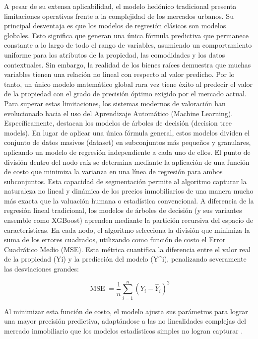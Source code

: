 A pesar de su extensa aplicabilidad, el modelo hedónico tradicional presenta limitaciones operativas frente a la complejidad de los mercados urbanos. Su principal desventaja es que los modelos de regresión clásicos son modelos globales. Esto significa que generan una única fórmula predictiva que permanece constante a lo largo de todo el rango de variables, asumiendo un comportamiento uniforme para los atributos de la propiedad, las comodidades y los datos contextuales. Sin embargo, la realidad de los bienes raíces demuestra que muchas variables tienen una relación no lineal con respecto al valor predicho. Por lo tanto, un único modelo matemático global rara vez tiene éxito al predecir el valor de la propiedad con el grado de precisión óptimo exigido por el mercado actual. Para superar estas limitaciones, los sistemas modernos de valoración han evolucionado hacia el uso del Aprendizaje Automático (Machine Learning). Específicamente, destacan los modelos de árboles de decisión (decision tree models). En lugar de aplicar una única fórmula general, estos modelos dividen el conjunto de datos masivos (dataset) en subconjuntos más pequeños y granulares, aplicando un modelo de regresión independiente a cada uno de ellos. El punto de división dentro del nodo raíz se determina mediante la aplicación de una función de costo que minimiza la varianza en una línea de regresión para ambos subconjuntos. Esta capacidad de segmentación permite al algoritmo capturar la naturaleza no lineal y dinámica de los precios inmobiliarios de una manera mucho más exacta que la valuación humana o estadística convencional. A diferencia de la regresión lineal tradicional, los modelos de árboles de decisión (y sus variantes ensemble como XGBoost) aprenden mediante la partición recursiva del espacio de características. En cada nodo, el algoritmo selecciona la división que minimiza la suma de los errores cuadrados, utilizando como función de costo el Error Cuadrático Medio (MSE). Esta métrica cuantifica la diferencia entre el valor real de la propiedad (Yi) y la predicción del modelo (Y\textasciicircum{}i), penalizando severamente las desviaciones grandes:

\[
\operatorname{MSE}=\frac{1}{n}\sum_{i=1}^{n}\left(Y_i-\hat{Y}_i\right)^2
\]

Al minimizar esta función de costo, el modelo ajusta sus parámetros para lograr una mayor precisión predictiva, adaptándose a las no linealidades complejas del mercado inmobiliario que los modelos estadísticos simples no logran capturar \parencite{KokEtAl2017}.

